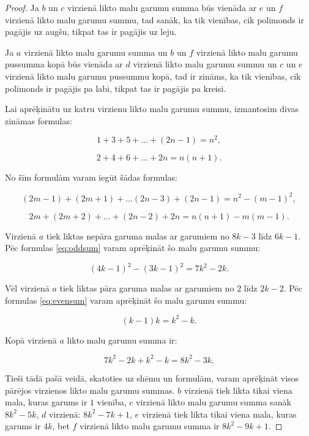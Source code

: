 \documentclass[utf8]{ludis2022}
\begin{document}
\begin{proof}
Ja $b$ un $c$ virzienā likto malu garumu summa būs vienāda ar $e$ un $f$ virzienā likto malu garumu summu, tad sanāk, ka tik vienības, cik polimonds ir pagājis uz augšu, tikpat tas ir pagājis uz leju.

Ja $a$ virzienā likto malu garumu summa un $b$ un $f$ virzienā likto malu garumu pussumma kopā būs vienāda ar $d$ virzienā likto malu garumu summu un $c$ un $e$ virzienā likto malu garumu pussummu kopā, tad ir zināms, ka tik vienības, cik polimonds ir pagājis pa labi, tikpat tas ir pagājis pa kreisi.


Lai aprēķinātu uz katru virzienu likto malu garumu summu, izmantosim divas zināmas formulas:

\begin{equation}\label{eq:oddsum0}
1+3+5+...+(2n-1)=n^{2} ,
\end{equation}

\begin{equation}\label{eq:evensum0}
2+4+6+...+2n=n(n+1) .
\end{equation}

No šīm formulām varam iegūt šādas formulas:

\begin{equation}\label{eq:oddsum}
(2m-1)+(2m+1)+...(2n-3)+(2n-1)=n^{2}-(m-1)^2 ,
\end{equation}

\begin{equation}\label{eq:evensum}
2m+(2m+2)+...+(2n-2)+2n=n(n+1)-m(m-1) .
\end{equation}


\vspace{20pt}

Virzienā $a$ tiek liktas nepāra garuma malas ar garumiem no $8k-3$ līdz $6k-1$. Pēc formulas \eqref{eq:oddsum} varam aprēķināt šo malu garumu summu:

$$(4k-1)^{2} - (3k-1)^{2} = 7k^{2}-2k.$$

Vēl virzienā $a$ tiek liktas  pāra garuma malas ar garumiem no $2$ līdz $2k-2$. Pēc formulas \eqref{eq:evensum} varam aprēķināt šo malu garumu summu:

$$(k-1)k = k^{2} - k.$$

Kopā virzienā $a$ likto malu garumu summa ir:

$$7k^{2}-2k + k^{2} - k = 8k^{2} -3k.$$

Tieši tādā pašā veidā, skatoties uz shēmu un formulām, varam aprēķināt visos pārējos virzienos likto malu garumu summas.
$b$ virzienā tiek likta tikai viena mala, kuras garums ir $1$ vienība,
$c$ virzienā likto malu garumu summa sanāk $ 8k^{2}-5k$, $d$ virzienā: $8k^{2}-7k+1$, $e$ virzienā tiek likta tikai viena mala, kuras garums ir $4k$, bet
$f$ virzienā likto malu garumu summa ir $8k^{2} -9k+1$. 



\end{proof}
\end{document}

